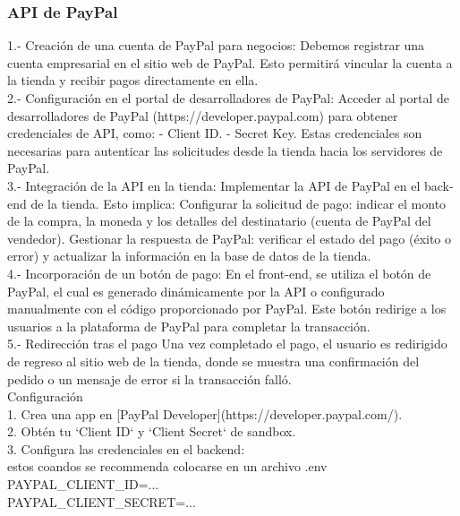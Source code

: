 \documentclass[a4paper,12pt]{article}
\begin{document}
\subsubsection{API de PayPal}
1.- Creación de una cuenta de PayPal para negocios:
Debemos registrar una cuenta empresarial en el sitio web de PayPal. Esto permitirá vincular la cuenta a la tienda y recibir pagos directamente en ella.\\

2.- Configuración en el portal de desarrolladores de PayPal:
Acceder al portal de desarrolladores de PayPal (https://developer.paypal.com) para obtener credenciales de API, como:
- Client ID.
- Secret Key.
Estas credenciales son necesarias para autenticar las solicitudes desde la tienda hacia los servidores de PayPal.\\

3.- Integración de la API en la tienda:
Implementar la API de PayPal en el back-end de la tienda. Esto implica:
Configurar la solicitud de pago: indicar el monto de la compra, la moneda y los detalles del destinatario (cuenta de PayPal del vendedor).
Gestionar la respuesta de PayPal: verificar el estado del pago (éxito o error) y actualizar la información en la base de datos de la tienda.\\

4.- Incorporación de un botón de pago:
En el front-end, se utiliza el botón de PayPal, el cual es generado dinámicamente por la API o configurado manualmente con el código proporcionado por PayPal. Este botón redirige a los usuarios a la plataforma de PayPal para completar la transacción.\\

5.- Redirección tras el pago
Una vez completado el pago, el usuario es redirigido de regreso al sitio web de la tienda, donde se muestra una confirmación del pedido o un mensaje de error si la transacción falló.\\

Configuración\\
1. Crea una app en [PayPal Developer](https://developer.paypal.com/).\\
2. Obtén tu `Client ID` y `Client Secret` de sandbox.\\
3. Configura las credenciales en el backend:\\

estos coandos se recommenda colocarse en un archivo .env \\

\textnormal{PAYPAL\_CLIENT\_ID=...}\\
\textnormal{PAYPAL\_CLIENT\_SECRET=...}\\
\end{document}
